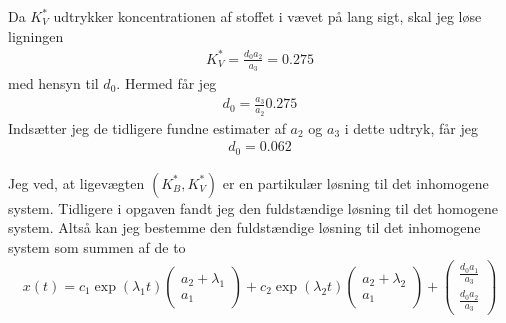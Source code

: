 \documentclass[12pt]{article}
\begin{document}
Da $K_V^*$ udtrykker koncentrationen af stoffet i vævet på lang sigt, skal jeg løse ligningen
\begin{align}
K_V^* = \frac{d_0a_2}{a_3} = 0.275
\end{align}
med hensyn til $d_0$. Hermed får jeg
\begin{align}
d_0 = \frac{a_3}{a_2} 0.275
\end{align}
Indsætter jeg de tidligere fundne estimater af $a_2$ og $a_3$ i dette udtryk, får jeg
\begin{align}
d_0 = 0.062
\end{align}

Jeg ved, at ligevægten $(K_B^*, K_V^*)$ er en partikulær løsning til det inhomogene system. Tidligere i opgaven fandt jeg den fuldstændige løsning til det homogene system. Altså kan jeg bestemme den fuldstændige løsning til det inhomogene system som summen af de to
\begin{align}
x(t) =   
c_1\exp(\lambda_1 t)\begin{pmatrix}
a_2 + \lambda_1\\
a_1
\end{pmatrix}  + c_2\exp(\lambda_2t)\begin{pmatrix}
a_2 + \lambda_2\\
a_1
\end{pmatrix} + \begin{pmatrix}
\frac{d_0a_1}{a_3} \\ 
\frac{d_0a_2}{a_3}
\end{pmatrix}
\end{align}
\end{document}
